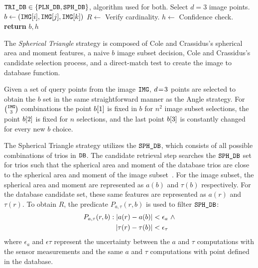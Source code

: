 \begin{algorithm}
\begin{algorithmic}[1]
        \LineComment $\texttt{TRI\_DB} \in \left\{ \texttt{PLN\_DB}, \texttt{SPH\_DB} \right\}$, algorithm used for both.
        \LineComment Select $d=3$ image points.
        \State $b \gets \left(\texttt{IMG}[i], \texttt{IMG}[j], \texttt{IMG}[k]\right)$ 
        \State $R \gets $ 
         \Comment Verify cardinality.
        \State $h \gets $ 
        \invalidBijection \Comment Confidence check.
        \State \textbf{return} $b, h$
        \EndIf
        \EndIf
        \EndFor
        \EndFor
        \EndFor
        \EndProcedure
    \end{algorithmic}
\end{algorithm}

The \textit{Spherical Triangle} strategy is composed of Cole and Crassidus's spherical area and moment features, a naive $b$ image subset decision, Cole and Crassidus's candidate selection process, and a direct-match test to create the image to database function.

Given a set of query points from the image $\texttt{IMG}$, $d \!=\! 3$ points are selected to obtain the $b$ set in the same straightforward manner as the Angle strategy.
For $\binom{\texttt{IMG}}{3}$ combinations the point $b[1]$ is fixed in $b$ for $n^2$ image subset selections, the point $b[2]$ is fixed for $n$ selections, and the last point $b[3]$ is constantly changed for every new $b$ choice.

The Spherical Triangle strategy utilizes the $\texttt{SPH\_DB}$, which consists of all possible combinations of trios in $\texttt{DB}$.
The candidate retrieval step searches the $\texttt{SPH\_DB}$ set for trios such that the spherical area and moment of the database trios are close to the spherical area and moment of the image subset~\cite{coleAndCrassidis:sphericalTriangleMethod}.
For the image subset, the spherical area and moment are represented as $a(b)$ and $\tau(b)$ respectively.
For the database candidate set, these same features are represented as $a(r)$ and $\tau(r)$.
To obtain $R$, the predicate $P_{a, \tau}(r, b)$ is used to filter $\texttt{SPH\_DB}$:
\begin{equation}
    \begin{aligned}
        P_{a, \tau}(r, b) : \left|  a(r) - a(b) \right| &< \epsilon_{a}
        \ \land \\ \left| \tau(r) - \tau(b) \right| &< \epsilon_{\tau}
    \end{aligned}
\end{equation}
where $\epsilon_{a}$ and $\epsilon{\tau}$ represent the uncertainty between the $a$ and $\tau$ computations with the sensor measurements and the same $a$ and $\tau$ computations with point defined in the database.

